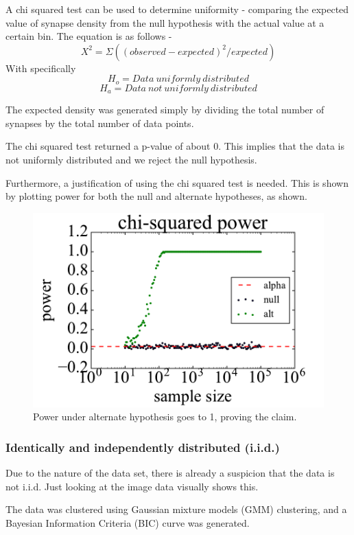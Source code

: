 \documentclass{article}
\begin{document}
A chi squared test can be used to determine uniformity - comparing the expected value of synapse density from the null hypothesis with the actual value at a certain bin. The equation is as follows - \[ X^2 = \Sigma((observed - expected)^2 /expected) \]
With specifically \[ H_o = Data\ uniformly\ distributed \] \[H_a =  Data\ not\ uniformly\ distributed \]

The expected density was generated simply by dividing the total number of synapses by the total number of data points.

The chi squared test returned a p-value of about 0. This implies that the data is not uniformly distributed and we reject the null hypothesis.

Furthermore, a justification of using the chi squared test is needed. This is shown by plotting power for both the null and alternate hypotheses, as shown.

\begin{figure}[h]
  \centering
  \includegraphics[scale = .3]{Fig9}
  \caption{Power under alternate hypothesis goes to 1, proving the claim.}
\end{figure}

\subsubsection{Identically and independently distributed (i.i.d.)}

Due to the nature of the data set, there is already a suspicion that the data is not i.i.d. Just looking at the image data  visually shows this.

The data was clustered using Gaussian mixture models (GMM) clustering, and a Bayesian Information Criteria (BIC) curve was generated. 
\end{document}
